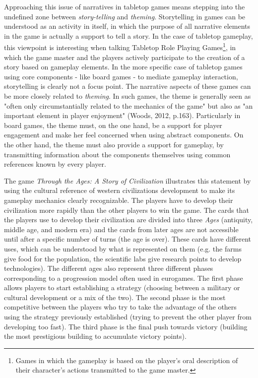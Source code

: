 Approaching this issue of narratives in tabletop games means stepping into the undefined zone between \textit{story-telling} and \textit{theming}. Storytelling in games can be understood as an activity in itself, in which the purpose of all narrative elements in the game is actually a support to tell a story. In the case of tabletop gameplay, this viewpoint is interesting when talking Tabletop Role Playing Games\footnote{Games in which the gameplay is based on the player's oral description of their character's actions transmitted to the game master.}, in which the game master and the players actively participate to the creation of a story based on gameplay elements. In the more specific case of tabletop games using core components - like board games - to mediate gameplay interaction, storytelling is clearly not a focus point. The narrative aspects of these games can be more closely related to \textit{theming}. In such games, the theme is generally seen as "often only circumstantially related to the mechanics of the game" but also as "an important element in player enjoyment" (Woods, 2012, p.163). Particularly in board games, the theme must, on the one hand, be a support for player engagement and make her feel concerned when using abstract components. On the other hand, the theme must also provide a support for gameplay, by transmitting information about the components themselves using common references known by every player.

The game \textit{{Through the Ages: A Story of Civilization}}\cite{game:ages} illustrates this statement by using the cultural reference of western civilizations development to make its gameplay mechanics clearly recognizable. The players have to develop their civilization more rapidly than the other players to win the game. The cards that the players use to develop their civilization are divided into three \textit{Ages} (antiquity, middle age, and modern era) and the cards from later ages are not accessible until after a specific number of turns (the age is over). These cards have different uses, which can be understood by what is represented on them (e.g. the farms give food for the population, the scientific labs give research points to develop technologies). The different ages also represent three different phases corresponding to a progression model often used in eurogames. The first phase allows players to start establishing a strategy (choosing between a military or cultural development or a mix of the two). The second phase is the most competitive between the players who try to take the advantage of the others using the strategy previously established (trying to prevent the other player from developing too fast). The third phase is the final push towards victory (building the most prestigious building to accumulate victory points).

